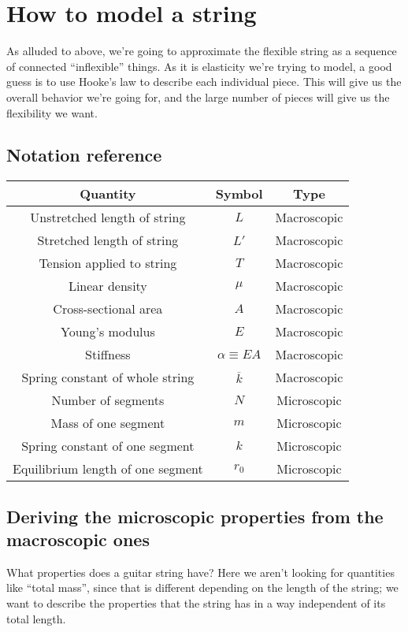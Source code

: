 \documentclass[12ampt]{article}
\begin{document}
\section{How to model a string}

As alluded to above, we’re going to approximate the flexible string as a sequence of connected
``inflexible'' things. As it is elasticity we’re trying to model, a good guess is to use Hooke’s
law to describe each individual piece. This will give us the overall behavior we’re going for,
and the large number of pieces will give us the flexibility we want.

\subsection{Notation reference}

\begin{tabular}{|c|c|c|}
\hline
Quantity & Symbol & Type \\ \hline
Unstretched length of string & $L$ & Macroscopic \\ \hline
Stretched length of string & $L'$ & Macroscopic \\ \hline
Tension applied to string & $T$ & Macroscopic \\ \hline
Linear density & $\mu$ & Macroscopic \\ \hline
Cross-sectional area & $A$ & Macroscopic\\ \hline
Young's modulus & $E$ & Macroscopic \\ \hline
Stiffness & $\alpha \equiv EA$& Macroscopic \\ \hline
Spring constant of whole string & $\overline k$ & Macroscopic \\ \hline
Number of segments & $N$ & Microscopic \\ \hline
Mass of one segment & $m$ & Microscopic \\ \hline
Spring constant of one segment & $k$ & Microscopic \\ \hline
Equilibrium length of one segment & $r_0$ & Microscopic \\ \hline
\end{tabular}

\subsection{Deriving the microscopic properties from the macroscopic ones}

What properties does a guitar string have? Here we aren’t looking for quantities like ``total mass'',
since that is different depending on the length of the string; we want to describe the properties that the string has in a way independent of its total length.
\end{document}
